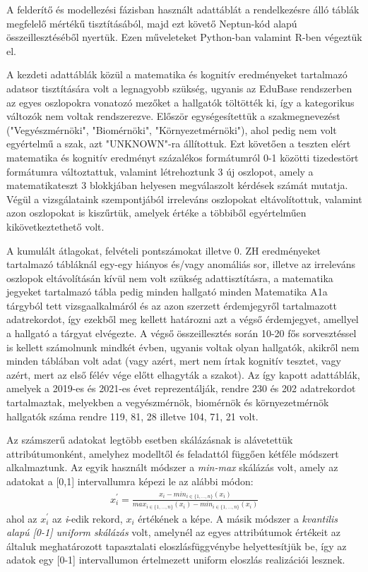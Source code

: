 \documentclass[12pt]{article}
\begin{document}
A felderítő és modellezési fázisban használt adattáblát a rendelkezésre álló táblák megfelelő mértékű tisztításából, majd ezt követő Neptun-kód alapú összeillesztéséből nyertük. Ezen műveleteket Python-ban valamint R-ben végeztük el.

A kezdeti adattáblák közül a matematika és kognitív eredményeket tartalmazó adatsor tisztítására volt a legnagyobb szükség, ugyanis az EduBase rendszerben az egyes oszlopokra vonatozó mezőket a hallgatók töltötték ki, így a kategorikus változók nem voltak rendszerezve. Először egységesítettük a szakmegnevezést ("Vegyészmérnöki", "Biomérnöki", "Környezetmérnöki"), ahol pedig nem volt egyértelmű a szak, azt "UNKNOWN"-ra állítottuk. Ezt követően a teszten elért matematika és kognitív eredményt százalékos formátumról 0-1 közötti tizedestört formátumra változtattuk, valamint létrehoztunk 3 új oszlopot, amely a matematikateszt 3 blokkjában helyesen megválaszolt kérdések számát mutatja. Végül a vizsgálataink szempontjából irreleváns oszlopokat eltávolítottuk, valamint azon oszlopokat is kiszűrtük, amelyek értéke a többiből egyértelműen kikövetkeztethető volt. 

A kumulált átlagokat, felvételi pontszámokat illetve 0. ZH eredményeket tartalmazó tábláknál egy-egy hiányos és/vagy anomáliás sor, illetve az irreleváns oszlopok eltávolításán kívül nem volt szükség adattisztításra, a matematika jegyeket tartalmazó tábla pedig minden hallgató minden Matematika A1a tárgyból tett vizsgaalkalmáról és az azon szerzett érdemjegyről tartalmazott adatrekordot, így ezekből meg kellett határozni azt a végső érdemjegyet, amellyel a hallgató a tárgyat elvégezte. A végső összeillesztés során 10-20 fős sorvesztéssel is kellett számolnunk mindkét évben, ugyanis voltak olyan hallgatók, akikről nem minden táblában volt adat (vagy azért, mert nem írtak kognitív tesztet, vagy azért, mert az első félév vége előtt elhagyták a szakot). Az így kapott adattáblák, amelyek a 2019-es és 2021-es évet reprezentálják, rendre 230 és 202 adatrekordot tartalmaztak, melyekben a vegyészmérnök, biomérnök és környezetmérnök hallgatók száma rendre 119, 81, 28 illetve 104, 71, 21 volt.

Az számszerű adatokat legtöbb esetben skálázásnak is alávetettük attribútumonként, amelyhez modelltől és feladattól függően kétféle módszert alkalmaztunk. Az egyik használt módszer a \emph{min-max} skálázás volt, amely az adatokat a [0,1] intervallumra képezi le az alábbi módon:\\
\begin{align}
x_{i}^{'} = \frac{x_{i}-min_{i \in \{1,\dots,n\}}(x_{i})}{max_{i \in \{1,\dots,n\}}(x_{i})-min_{i \in \{1,\dots,n\}}(x_{i})}
\end{align}
ahol az $x_{i}^{'}$ az \emph{i}-edik rekord, $x_i$ értékének a képe. A másik módszer a \emph{kvantilis alapú [0-1] uniform skálázás} volt, amelynél az egyes attribútumok értékeit az általuk meghatározott tapasztalati eloszlásfüggvénybe helyettesítjük be, így az adatok egy [0-1] intervallumon értelmezett uniform eloszlás realizációi lesznek.
\end{document}
